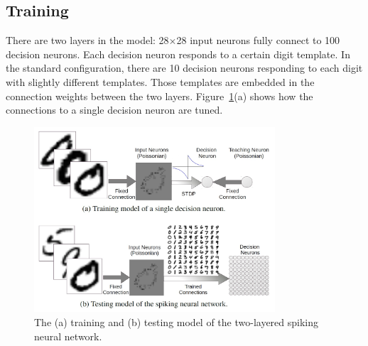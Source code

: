\subsection{Training}
There are two layers in the model: 28$\times$28 input neurons fully connect to 100 decision neurons.
Each decision neuron responds to a certain digit template.
In the standard configuration, there are 10 decision neurons responding to each digit with slightly different templates.
Those templates are embedded in the connection weights between the two layers.
Figure~\ref{fig:model}(a) shows how the connections to a single decision neuron are tuned.

\begin{figure}[thb!]
	\centering
	\includegraphics[width=0.8\textwidth]{pics_bench/fig6.jpg}
	\caption{The (a) training and (b) testing model of the two-layered spiking neural network.}
	\label{fig:model}
\end{figure} 

